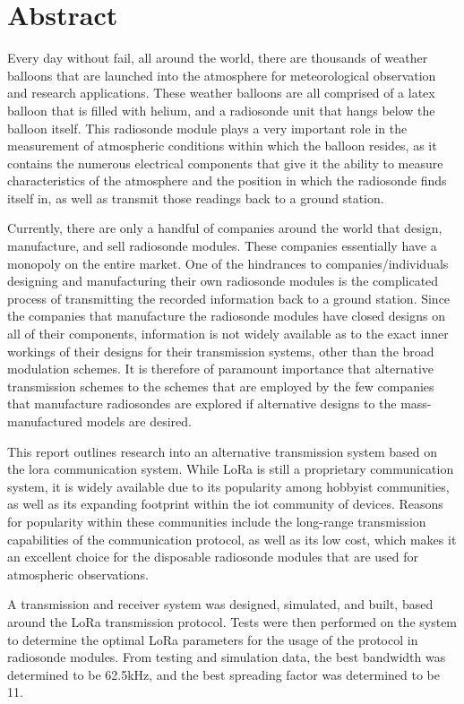 \documentclass[class=report,11pt,crop=false]{standalone}
\begin{document}
\chapter*{Abstract}
Every day without fail, all around the world, there are thousands of weather balloons that are launched into the atmosphere for meteorological observation and research applications. These weather balloons are all comprised of a latex balloon that is filled with helium, and a radiosonde unit that hangs below the balloon itself. This radiosonde module plays a very important role in the measurement of atmospheric conditions within which the balloon resides, as it contains the numerous electrical components that give it the ability to measure characteristics of the atmosphere and the position in which the radiosonde finds itself in, as well as transmit those readings back to a ground station.

Currently, there are only a handful of companies around the world that design, manufacture, and sell radiosonde modules. These companies essentially have a monopoly on the entire market. One of the hindrances to companies/individuals designing and manufacturing their own radiosonde modules is the complicated process of transmitting the recorded information back to a ground station. Since the companies that manufacture the radiosonde modules have closed designs on all of their components, information is not widely available as to the exact inner workings of their designs for their transmission systems, other than the broad modulation schemes. It is therefore of paramount importance that alternative transmission schemes to the schemes that are employed by the few companies that manufacture radiosondes are explored if alternative designs to the mass-manufactured models are desired.

This report outlines research into an alternative transmission system based on the \gls{lora} communication system. While LoRa is still a proprietary communication system, it is widely available due to its popularity among hobbyist communities, as well as its expanding footprint within the \gls{iot} community of devices. Reasons for popularity within these communities include the long-range transmission capabilities of the communication protocol, as well as its low cost, which makes it an excellent choice for the disposable radiosonde modules that are used for atmospheric observations.

A transmission and receiver system was designed, simulated, and built, based around the LoRa transmission protocol. Tests were then performed on the system to determine the optimal LoRa parameters for the usage of the protocol in radiosonde modules. From testing and simulation data, the best bandwidth was determined to be 62.5kHz, and the best spreading factor was determined to be 11. 

\ifstandalone
% 
\fi
\end{document}

